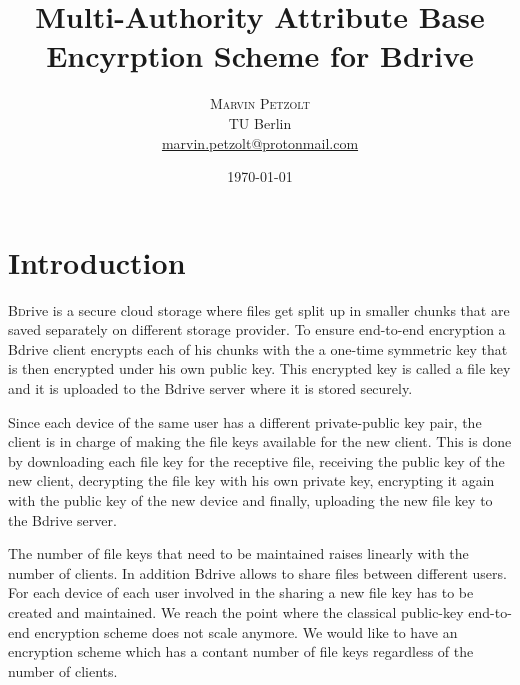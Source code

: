 \documentclass[twocolumn]{article}
\title{Multi-Authority Attribute Base Encyrption Scheme for Bdrive } %
\author{%
\textsc{Marvin Petzolt}\\[1ex] %
\normalsize TU Berlin \\ %
\normalsize \href{mailto:marvin.petzolt@protonmail.com}{marvin.petzolt@protonmail.com} %
}
\date{\today} %
\begin{document}
\twocolumn[
    \maketitle
]



\section{Introduction}
\label{sec:introduction}

\lettrine[nindent=0em,lines=3]{B}
drive is a secure cloud storage where files get split up in smaller chunks that are saved separately on different storage provider. To ensure end-to-end encryption a Bdrive client encrypts each of his chunks with the a one-time symmetric key that is then encrypted under his own public key. This encrypted key is called a file key and it is uploaded to the Bdrive server where it is stored securely. 

Since each device of the same user has a different private-public key pair, the client is in charge of making the file keys available for the new client. This is done by downloading each file key for the receptive file, receiving the public key of the new client, decrypting the file key with his own private key, encrypting it again with the public key of the new device and finally, uploading the new file key to the Bdrive server.

The number of file keys that need to be maintained raises linearly with the number of clients. In addition Bdrive allows to share files between different users. For each device of each user involved in the sharing a new file key has to be created and maintained. We reach the point where the classical public-key end-to-end encryption scheme does not scale anymore. We would like to have an encryption scheme which has a contant number of file keys regardless of the number of clients.


\end{document}
